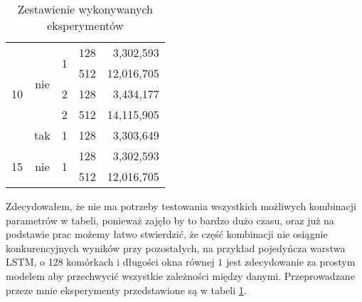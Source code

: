 \begin{table}[ht]
{\begin{tabular}{ccccc}
            \multicolumn{1}{|c|}{\multirow{5}{*}{10}} & \multicolumn{1}{c|}{\multirow{4}{*}{nie}} & \multicolumn{1}{c|}{\multirow{2}{*}{1}} & \multicolumn{1}{c|}{128}                        & \multicolumn{1}{r|}{3,302,593}                         \\ \cline{4-5} 
            \multicolumn{1}{|c|}{}                    & \multicolumn{1}{c|}{}                     & \multicolumn{1}{c|}{}                   & \multicolumn{1}{c|}{512}                        & \multicolumn{1}{r|}{12,016,705}                         \\ \cline{3-5} 
            \multicolumn{1}{|c|}{}                    & \multicolumn{1}{c|}{}                     & \multicolumn{1}{c|}{2}                  & \multicolumn{1}{c|}{128}                        & \multicolumn{1}{r|}{3,434,177}                         \\ \cline{3-5} 
            \multicolumn{1}{|c|}{}                    & \multicolumn{1}{c|}{}                     & \multicolumn{1}{c|}{2}                  & \multicolumn{1}{c|}{512}                        & \multicolumn{1}{r|}{14,115,905}                         \\ \cline{2-5} 
            \multicolumn{1}{|c|}{}                    & \multicolumn{1}{c|}{tak}                  & \multicolumn{1}{c|}{1}                  & \multicolumn{1}{c|}{128}                        & \multicolumn{1}{r|}{3,303,649}                         \\ \hline
            \multicolumn{1}{|c|}{\multirow{2}{*}{15}} & \multicolumn{1}{c|}{\multirow{2}{*}{nie}} & \multicolumn{1}{c|}{\multirow{2}{*}{1}} & \multicolumn{1}{c|}{128}                        & \multicolumn{1}{r|}{3,302,593}                         \\ \cline{4-5} 
            \multicolumn{1}{|c|}{}                    & \multicolumn{1}{c|}{}                     & \multicolumn{1}{c|}{}                   & \multicolumn{1}{c|}{512}                        & \multicolumn{1}{r|}{12,016,705}                         \\ \hline
            \end{tabular}}
    \caption{Zestawienie wykonywanych eksperymentów} 
    \label{eksperymenty}
\end{table} 
Zdecydowałem, że nie ma potrzeby testowania wszystkich możliwych kombinacji parametrów w tabeli, ponieważ zajęło by to bardzo dużo czasu, oraz już na podstawie prac 
\cite{hellendoorn, pythia} możemy łatwo stwierdzić, że część kombinacji nie osiągnie konkurencyjnych wyników przy pozostałych, na przykład pojedyńcza warstwa LSTM, o 
128 komórkach i długości okna równej \begin{math}1\end{math} jest zdecydowanie za prostym modelem aby przechwycić wszystkie zależności między danymi. Przeprowadzane 
przeze mnie eksperymenty przedstawione są w tabeli \ref{eksperymenty}. 


